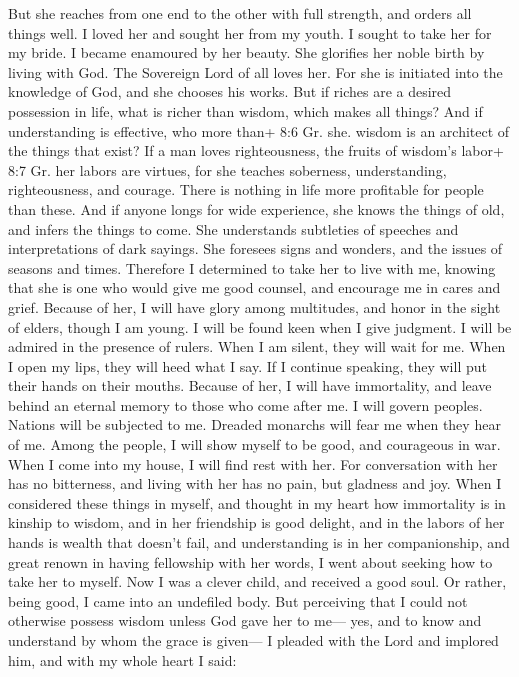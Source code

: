  But she reaches from one end to the other with full
strength, and orders all things well.  I loved her and
sought her from my youth. I sought to take her for my bride. I became
enamoured by her beauty.  She glorifies her noble birth by
living with God. The Sovereign Lord of all loves her.  For
she is initiated into the knowledge of God, and she chooses his works.
 But if riches are a desired possession in life, what is
richer than wisdom, which makes all things?  And if
understanding is effective, who more than+ 8:6 Gr. she. wisdom is an
architect of the things that exist?  If a man loves
righteousness, the fruits of wisdom's labor+ 8:7 Gr. her labors are
virtues, for she teaches soberness, understanding, righteousness, and
courage. There is nothing in life more profitable for people than these.
 And if anyone longs for wide experience, she knows the
things of old, and infers the things to come. She understands subtleties
of speeches and interpretations of dark sayings. She foresees signs and
wonders, and the issues of seasons and times.  Therefore I
determined to take her to live with me, knowing that she is one who
would give me good counsel, and encourage me in cares and grief.
 Because of her, I will have glory among multitudes, and
honor in the sight of elders, though I am young.  I will be
found keen when I give judgment. I will be admired in the presence of
rulers.  When I am silent, they will wait for me. When I
open my lips, they will heed what I say. If I continue speaking, they
will put their hands on their mouths.  Because of her, I
will have immortality, and leave behind an eternal memory to those who
come after me.  I will govern peoples. Nations will be
subjected to me.  Dreaded monarchs will fear me when they
hear of me. Among the people, I will show myself to be good, and
courageous in war.  When I come into my house, I will find
rest with her. For conversation with her has no bitterness, and living
with her has no pain, but gladness and joy.  When I
considered these things in myself, and thought in my heart how
immortality is in kinship to wisdom,  and in her friendship
is good delight, and in the labors of her hands is wealth that doesn't
fail, and understanding is in her companionship, and great renown in
having fellowship with her words, I went about seeking how to take her
to myself.  Now I was a clever child, and received a good
soul.  Or rather, being good, I came into an undefiled
body.  But perceiving that I could not otherwise possess
wisdom unless God gave her to me--- yes, and to know and understand by
whom the grace is given--- I pleaded with the Lord and implored him, and
with my whole heart I said:

